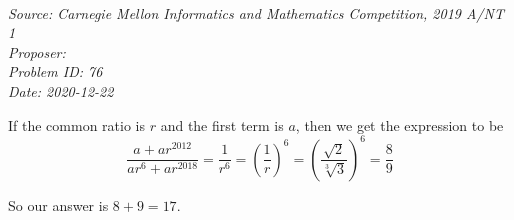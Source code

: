 \SSbreak\\
\emph{Source: Carnegie Mellon Informatics and Mathematics Competition, 2019 A/NT 1}\\
\emph{Proposer: \PNJOY}\\
\emph{Problem ID: 76}\\
\emph{Date: 2020-12-22}\\
\SSbreak

\bigskip

\begin{solution}\hfil\medskip
    
If the common ratio is \(r\) and the first term is \(a\), then we get the expression to be 
\[\frac{a+ar^{2012}}{ar^6+ar^{2018}} = \frac{1}{r^6} = \left ( \frac1r \right ) ^6 = \left(\frac{\sqrt{2}}{\sqrt[3]{3}} \right)^6 = \frac89\]

So our answer is \( 8+9 = \boxed{17}\).
\end{solution}\bigskip
